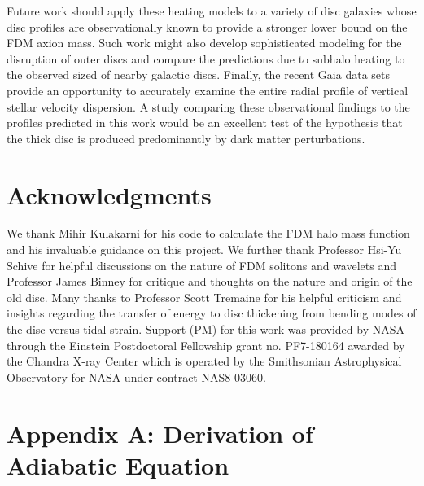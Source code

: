 \documentclass[usenatbib]{mnras}
\begin{document}
{\par

Future work should apply these heating models to a variety of disc galaxies whose disc profiles are observationally known to provide a stronger lower bound on the FDM axion mass. Such work might also develop sophisticated modeling for the disruption of outer discs and compare the predictions due to subhalo heating to the observed sized of nearby galactic discs. Finally, the recent Gaia data sets provide an opportunity to accurately examine the entire radial profile of vertical stellar velocity dispersion. A study comparing these observational findings to the profiles predicted in this work would be an excellent test of the hypothesis that the thick disc is produced predominantly by dark matter perturbations.   
}

\section*{Acknowledgments}

We thank Mihir Kulakarni for his code to calculate the FDM halo mass function and his invaluable guidance on this project. We further thank Professor Hsi-Yu Schive for helpful discussions on the nature of FDM solitons and wavelets and Professor James Binney for critique and thoughts on the nature and origin of the old disc. Many thanks to Professor Scott Tremaine for his helpful criticism and insights regarding the transfer of energy to disc thickening from bending modes of the disc versus tidal strain. Support (PM) for this work was provided by NASA through the Einstein Postdoctoral Fellowship grant no. PF7-180164 awarded by the Chandra X-ray Center which is operated by the Smithsonian Astrophysical Observatory for NASA under contract NAS8-03060. 


\section*{Appendix A: Derivation of Adiabatic Equation}
\end{document}
